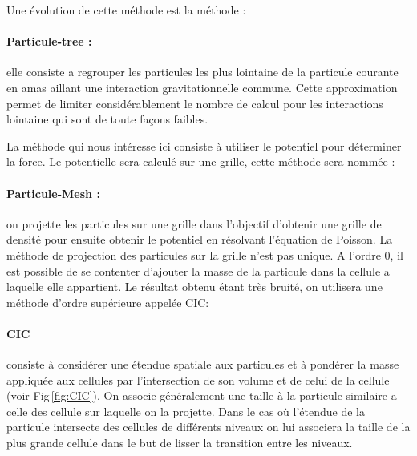 Une évolution de cette méthode est la méthode :
\paragraph{Particule-tree : } elle consiste a regrouper les particules les plus lointaine de la particule courante en amas aillant une interaction gravitationnelle commune.
Cette approximation permet de limiter considérablement le nombre de calcul pour les interactions lointaine qui sont de toute façons faibles.



%

La méthode qui nous intéresse ici consiste à utiliser le potentiel pour déterminer la force.
Le potentielle sera calculé sur une grille, cette méthode sera nommée :
\paragraph{Particule-Mesh : } on projette les particules sur une grille dans l'objectif d'obtenir  une grille de densité pour ensuite obtenir le potentiel en résolvant l'équation de Poisson.
La méthode de projection des particules sur la grille n'est pas unique.
A l'ordre 0, il est possible de se contenter d'ajouter la masse de la particule dans la cellule a laquelle elle appartient.
Le résultat obtenu étant très bruité, on utilisera une méthode d'ordre supérieure appelée \ac{CIC}:
\paragraph{CIC} consiste à considérer une étendue spatiale aux particules et à pondérer la masse appliquée aux cellules par l'intersection de son volume et de celui de la cellule (voir Fig\,\ref{fig:CIC}).
On associe généralement une taille à la particule similaire a celle des cellule sur laquelle on la projette.
Dans le cas où l’étendue de la particule intersecte des cellules de différents niveaux on lui associera la taille de la plus grande cellule dans le but de lisser la transition entre les niveaux.

